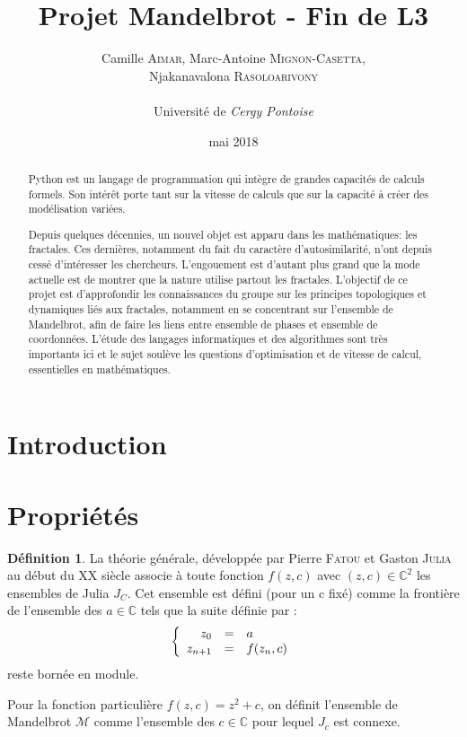 \documentclass[12pt,a4paper]{article}
\title{Projet Mandelbrot - Fin de L3}
\author{Camille \textsc{Aimar}, Marc-Antoine \textsc{Mignon-Casetta},\\Njakanavalona \textsc{Rasoloarivony} \\ \\ Université de\emph{ Cergy Pontoise}}
\date{mai 2018}
\theoremstyle{plain}
\theoremstyle{plain}
\theoremstyle{definition}
\newtheorem{definition}{Définition}
\theoremstyle{remark}
\begin{document}
\maketitle
\newpage
\begin{abstract}
Python est un langage de programmation qui intègre de grandes capacités de calculs formels. Son intérêt porte tant sur la vitesse de calculs que sur la capacité à créer des modélisation variées.
 
Depuis quelques décennies, un nouvel objet est apparu dans les mathématiques: les fractales. Ces dernières, notamment du fait du caractère d’autosimilarité, n'ont depuis cessé d'intéresser les chercheurs. L'engouement est d’autant plus grand que la mode actuelle est de montrer que la nature utilise partout les fractales. 
L'objectif de ce projet est d'approfondir les connaissances du groupe sur les principes topologiques et dynamiques liés aux fractales, notamment en se concentrant sur l'ensemble de Mandelbrot, afin de faire les liens entre ensemble de phases et ensemble de coordonnées. 
L'étude des langages informatiques et des algorithmes sont très importants ici et le sujet soulève les questions d'optimisation et de vitesse de calcul, essentielles en mathématiques. 
\end{abstract}
\section{Introduction}

\newpage
\section{Propriétés}
	\begin{definition}
La théorie générale, développée par Pierre \textsc{Fatou} et Gaston \textsc{Julia} au début du \textsc{XX}\ieme {} siècle associe à toute fonction $f(z,c)$ avec $(z,c) \in \mathbb{C}^2$ les ensembles de Julia $J_C$. Cet ensemble est défini (pour un c fixé) comme la frontière de l'ensemble des $a \in \mathbb{C}$ tels que la suite définie par :
\begin{equation}\label{julia}
\left\{
\begin{array}{r c l}
z_0 &=& a\\
z_{n+1} &=& f(z_n, c)
\end{array}
\right.
\end{equation}
reste bornée en module.
\end{definition}

Pour la fonction particulière $f(z,c)=z^2+c$, on définit l'ensemble de Mandelbrot $\mathcal{M}$ comme l'ensemble des $c \in \mathbb{C}$ pour lequel $J_c$ est connexe.
\end{document}
